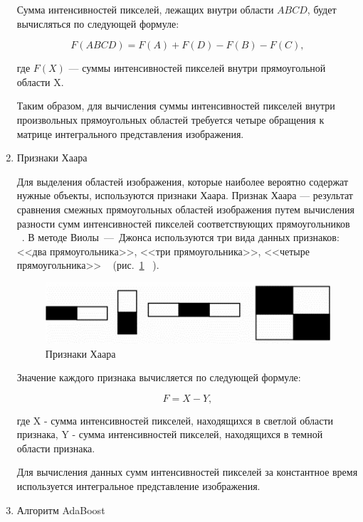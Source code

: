 \begin{enumerate}
    Сумма интенсивностей пикселей, лежащих внутри области $ABCD$, будет вычисляться по следующей формуле:

    \begin{equation}
        F(ABCD) = F(A) + F(D) - F(B) - F(C),
    \end{equation}

    где $F(X)$ --- суммы интенсивностей пикселей внутри прямоугольной области X.

    Таким образом, для вычисления суммы интенсивностей пикселей внутри произвольных прямоугольных областей требуется четыре обращения к матрице интегрального представления изображения.
    
    \item Признаки Хаара

    Для выделения областей изображения, которые наиболее вероятно содержат нужные объекты, используются признаки Хаара. Признак Хаара --- результат сравнения смежных прямоугольных областей изображения путем вычисления разности сумм интенсивностей пикселей соответствующих прямоугольников ~\cite{novosibirsk}. 
    В методе Виолы~---~Джонса используются три вида данных признаков: <<два прямоугольника>>, <<три прямоугольника>>, <<четыре прямоугольника>> ~\cite{viola} (рис.~\ref{img:haar} ~\cite{astrahan}).

    \begin{figure}[h]
	\centering
	\includegraphics[height=0.1\textheight]{img/haar.jpg}
	\caption{Признаки Хаара}
    \label{img:haar}
    \end{figure}

    Значение каждого признака вычисляется по следующей формуле:

    \begin{equation}
        F = X - Y,
    \end{equation}

    где X - сумма интенсивностей пикселей, находящихся в светлой области признака, Y - сумма интенсивностей пикселей, находящихся в темной области признака.

    Для вычисления данных сумм интенсивностей пикселей за константное время используется интегральное представление изображения.
    
    \item Алгоритм AdaBoost


\end{enumerate}
